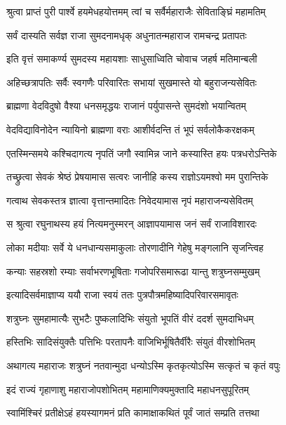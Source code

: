 \twolineshloka
{श्रुत्वा प्राप्तं पुरी पार्श्वे हयमेधहयोत्तमम्}
{त्वां च सर्वैर्महाराजैः सेविताङ्घ्रिं महामतिम्}%

\twolineshloka
{सर्वं दास्यति सर्वज्ञ राजा सुमदनामधृक्}
{अधुनातन्महाराज रामचन्द्र प्रतापतः}%


\twolineshloka
{इति वृत्तं समाकर्ण्य सुमदस्य महायशाः}
{साधुसाध्विति चोवाच जहर्ष मतिमान्बली}%

\twolineshloka
{अहिच्छत्रापतिः सर्वैः स्वगणैः परिवारितः}
{सभायां सुखमास्ते यो बहुराजन्यसेवितः}%

\twolineshloka
{ब्राह्मणा वेदविदुषो वैश्या धनसमृद्धयः}
{राजानं पर्युपासन्ते सुमदंशो भयान्वितम्}%

\twolineshloka
{वेदविद्याविनोदेन न्यायिनो ब्राह्मणा वराः}
{आशीर्वदन्ति तं भूपं सर्वलोकैकरक्षकम्}%

\twolineshloka
{एतस्मिन्समये कश्चिदागत्य नृपतिं जगौ}
{स्वामिन्न जाने कस्यास्ति हयः पत्रधरोऽन्तिके}%

\twolineshloka
{तच्छ्रुत्वा सेवकं श्रेष्ठं प्रेषयामास सत्वरः}
{जानीहि कस्य राज्ञोऽयमश्वो मम पुरान्तिके}%

\twolineshloka
{गत्वाथ सेवकस्तत्र ज्ञात्वा वृत्तान्तमादितः}
{निवेदयामास नृपं महाराजन्यसेवितम्}%

\twolineshloka
{स श्रुत्वा रघुनाथस्य हयं नित्यमनुस्मरन्}
{आज्ञापयामास जनं सर्वं राजाविशारदः}%

\twolineshloka
{लोका मदीयाः सर्वे ये धनधान्यसमाकुलाः}
{तोरणादीनि गेहेषु मङ्गलानि सृजन्त्विह}%

\twolineshloka
{कन्याः सहस्रशो रम्याः सर्वाभरणभूषिताः}
{गजोपरिसमारूढा यान्तु शत्रुघ्नसम्मुखम्}%

\twolineshloka
{इत्यादिसर्वमाज्ञाप्य ययौ राजा स्वयं ततः}
{पुत्रपौत्रमहिष्यादिपरिवारसमावृतः}%

\twolineshloka
{शत्रुघ्नः सुमहामात्यैः सुभटैः पुष्कलादिभिः}
{संयुतो भूपतिं वीरं ददर्श सुमदाभिधम्}%

\twolineshloka
{हस्तिभिः सादिसंयुक्तैः पत्तिभिः परतापनैः}
{वाजिभिर्भूषितैर्वीरैः संयुतं वीरशोभितम्}%

\twolineshloka
{अथागत्य महाराजः शत्रुघ्नं नतवान्मुदा}
{धन्योऽस्मि कृतकृत्योऽस्मि सत्कृतं च कृतं वपुः}%

\twolineshloka
{इदं राज्यं गृहाणाशु महाराजोपशोभितम्}
{महामाणिक्यमुक्तादि महाधनसुपूरितम्}%

\twolineshloka
{स्वामिंश्चिरं प्रतीक्षेऽहं हयस्यागमनं प्रति}
{कामाक्षाकथितं पूर्वं जातं सम्प्रति तत्तथा}%

